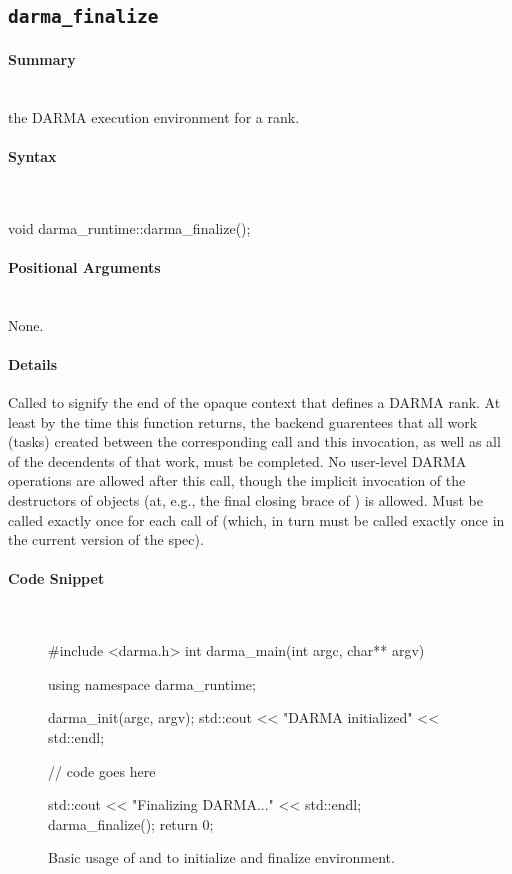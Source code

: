 
\subsection{\texttt{darma\_finalize}}
\label{ssec:api_fe_finalize}

\paragraph{Summary}\mbox{}\\
 the DARMA execution environment for a \gls{rank}.

\paragraph{Syntax}\mbox{}\\ 
\begin{CppCode}
void darma_runtime::darma_finalize();
\end{CppCode}

\paragraph{Positional Arguments}\mbox{} \\
None. 

\paragraph{Details}\mbox{} 
Called to signify the end of the \gls{opaque context} that defines a DARMA
\gls{rank}.  At
least by the time this function returns, the backend guarentees that all work
(tasks) created between the corresponding  call and this
invocation, as well as all of the decendents of that work, must be
completed.  No user-level DARMA operations are allowed after this call, though
the implicit invocation of the destructors of  objects
(at, e.g., the final closing brace of ) is allowed.  Must
be called exactly once for each call of  (which, in turn
must be called exactly once in the current version of the spec).

\paragraph{Code Snippet}\mbox{} \\
\begin{figure}[!h]
\begin{CppCodeNumb}
#include <darma.h>
int darma_main(int argc, char** argv)
{
  using namespace darma_runtime;

  darma_init(argc, argv);
  std::cout << "DARMA initialized" << std::endl;

  // code goes here

  std::cout << "Finalizing DARMA..." << std::endl;
  darma_finalize();
  return 0;
}
\end{CppCodeNumb}
\caption{Basic usage of \protect{} and \protect{} 
to initialize and finalize environment.}
\label{fig:fe_api_init}
\end{figure}

